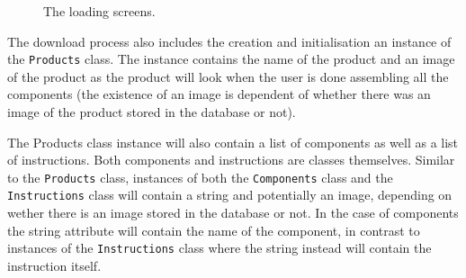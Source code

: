 	\begin{figure}[ht!]
		\centering
   		 \qquad
   		 \qquad
		\caption{The loading screens.}
		\label{downloadLoading}
	\end{figure}

The download process also includes the creation and initialisation an instance of the \texttt{Products} class. The instance contains the name of the product and an image of the product as the product will look when the user is done assembling all the components (the existence of an image is dependent of whether there was an image of the product stored in the database or not).

The Products class instance will also contain a list of components as well as a list of instructions. Both components and instructions are classes themselves. Similar to the \texttt{Products} class, instances of both the \texttt{Components} class and the \texttt{Instructions} class will contain a string and potentially an image, depending on wether there is an image stored in the database or not. In the case of components the string attribute will contain the name of the component, in contrast to instances of the \texttt{Instructions} class where the string instead will contain the instruction itself.

